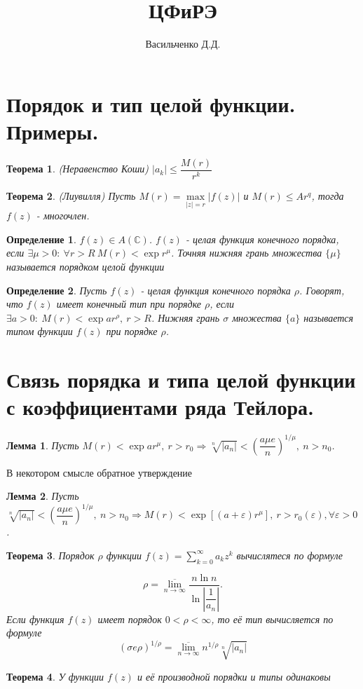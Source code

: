 \documentclass[9pt]{article}
\title{ЦФиРЭ}
\author{Васильченко Д.Д.}
\date{}
\newtheorem{theorem}{Теорема} %
\newtheorem{lemma}{Лемма} %
\newtheorem{definition}{Определение}
\begin{document}
	\maketitle
	\section{ Порядок и тип целой функции. Примеры.}
		
		\begin{theorem} (Неравенство Коши)\newline
			$|a_k| \leq \dfrac{M(r)}{r^k}$
		\end{theorem}
		\begin{theorem} (Лиувилля)\newline
			Пусть $M(r) = \max\limits_{|z| = r} |f(z)|$  и $M(r) \leq Ar^q$, тогда $f(z)$ - многочлен.
		\end{theorem}
		\begin{definition}
			$f(z) \in A(\mathbb{C})$. $f(z)$ - целая функция конечного порядка, если $\exists \mu > 0: \ \forall r > R \ M(r) < \exp{r^\mu}$. Точняя нижняя грань множества $\{\mu\}$ называется порядком целой функции
		\end{definition}
		\begin{definition}
			Пусть $f(z)$ - целая функция конечного порядка $\rho$. Говорят, что $f(z)$ имеет конечный тип при порядке $\rho$, если $\exists a > 0: \ M(r) < \exp{ar^\rho}, \ r > R$. Нижняя грань $\sigma$ множества $\{a\}$ называется типом функции $f(z)$ при порядке $\rho$.
		\end{definition}
	\section{Связь порядка и типа целой функции с коэффициентами ряда Тейлора.}
		\begin{lemma}
			Пусть $M(r) < \exp{ar^\mu}, \ r > r_0 \Rightarrow \sqrt[n]{|a_n|} < \left(\dfrac{a\mu e}{n}\right)^{1/\mu}, \ n > n_0$.
		\end{lemma}
		В некотором смысле обратное утверждение
		\begin{lemma}
			Пусть $\sqrt[n]{|a_n|} < \left(\dfrac{a\mu e}{n}\right)^{1/\mu} , \ n > n_0 \Rightarrow M(r) < \exp{[(a+\varepsilon) r^\mu]}, \ r > r_0(\varepsilon), \forall \varepsilon > 0 $.
		\end{lemma}
		\begin{theorem}
			Порядок $\rho$ функции $f(z) = \sum\limits_{k=0}^{\infty} a_k z^k$ вычислятеся по формуле 
			
			$$
			\rho = \overline{\lim\limits_{n\to \infty}} \dfrac{n \ln{n}}{\ln{|\dfrac{1}{a_n}|}}.
			$$
			Если функция $f(z)$ имеет порядок $0 < \rho < \infty$, то её тип вычисляется по формуле 
			$$
			(\sigma e \rho)^{1/\rho} = \overline{\lim\limits_{n\to\infty}} n^{1/\rho} \sqrt[n]{|a_n|}
			$$
		\end{theorem}
		\begin{theorem}
			У функции $f(z)$ и её производной порядки и типы одинаковы
		\end{theorem}
\end{document}
